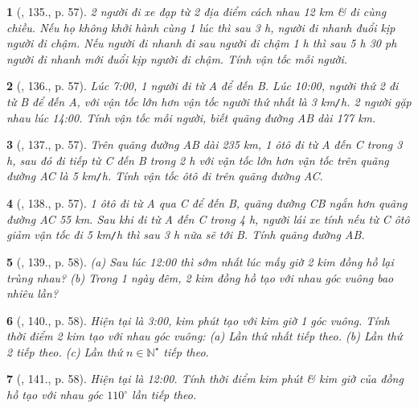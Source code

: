 \documentclass{article}
\newtheorem{baitoan}{}
\begin{document}
\begin{baitoan}[\cite{Binh_Toan_6_tap_2}, 135., p. 57]
	2 người đi xe đạp từ 2 địa điểm cách nhau {\rm12 km} \& đi cùng chiều. Nếu họ không khởi hành cùng 1 lúc thì sau {\rm3 h}, người đi nhanh đuổi kịp người đi chậm. Nếu người đi nhanh đi sau người đi chậm {\rm1 h} thì sau {\rm5 h 30 ph} người đi nhanh mới đuổi kịp người đi chậm. Tính vận tốc mỗi người.
\end{baitoan}

\begin{baitoan}[\cite{Binh_Toan_6_tap_2}, 136., p. 57]
	Lúc {\rm7:00}, 1 người đi từ A để đến B. Lúc {\rm10:00}, người thứ 2 đi từ B để đến A, với vận tốc lớn hơn vận tốc người thứ nhất là {\rm3 km{\tt/}h}. 2 người gặp nhau lúc {\rm14:00}. Tính vận tốc mỗi người, biết quãng đường AB dài {\rm177 km}.
\end{baitoan}

\begin{baitoan}[\cite{Binh_Toan_6_tap_2}, 137., p. 57]
	Trên quãng đường AB dài {\rm235 km}, 1 ôtô đi từ A đến C trong {\rm3 h}, sau đó đi tiếp từ C đến B trong {\rm2 h} với vận tốc lớn hơn vận tốc trên quãng đường AC là {\rm5 km{\tt/}h}. Tính vận tốc ôtô đi trên quãng đường AC.
\end{baitoan}

\begin{baitoan}[\cite{Binh_Toan_6_tap_2}, 138., p. 57]
	1 ôtô đi từ A qua C để đến B, quãng đường CB ngắn hơn quãng đường AC {\rm55 km}. Sau khi đi từ A đến C trong {\rm4 h}, người lái xe tính nếu từ C ôtô giảm vận tốc đi {\rm5 km{\tt/}h} thì sau {\rm3 h} nữa sẽ tới B. Tính quãng đường AB.
\end{baitoan}

\begin{baitoan}[\cite{Binh_Toan_6_tap_2}, 139., p. 58]
	(a) Sau lúc {\rm12:00} thì sớm nhất lúc mấy giờ 2 kim đồng hồ lại trùng nhau? (b) Trong 1 ngày đêm, 2 kim đồng hồ tạo với nhau góc vuông bao nhiêu lần?
\end{baitoan}

\begin{baitoan}[\cite{Binh_Toan_6_tap_2}, 140., p. 58]
	Hiện tại là {\rm3:00}, kim phút tạo với kim giờ 1 góc vuông. Tính thời điểm 2 kim tạo với nhau góc vuông: (a) Lần thứ nhất tiếp theo. (b) Lần thứ 2 tiếp theo. (c) Lần thứ $n\in\mathbb{N}^\star$ tiếp theo.
\end{baitoan}

\begin{baitoan}[\cite{Binh_Toan_6_tap_2}, 141., p. 58]
	Hiện tại là {\rm12:00}. Tính thời điểm kim phút \& kim giờ của đồng hồ tạo với nhau góc $110^\circ$ lần tiếp theo.
\end{baitoan}
\end{document}
